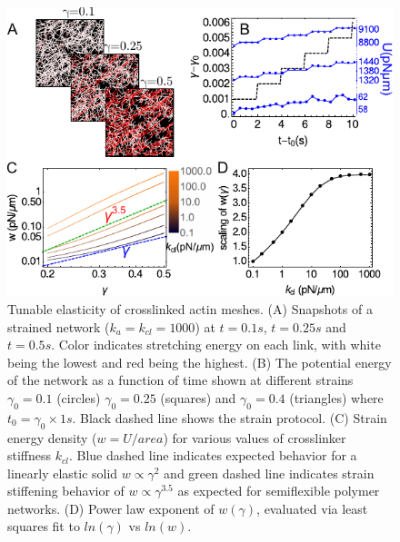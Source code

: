 \documentclass[12pt]{article}
\begin{document}
\begin{figure}[H]
  \centering
  \includegraphics[scale=1.2]{figs/shear_result.pdf}
  \caption{%
    \label{fig:stress}%
    Tunable elasticity of crosslinked actin meshes. 
    (A) Snapshots of a strained network ($k_a=k_{cl}=1000$) at $t=0.1s$, 
    $t=0.25s$ and $t=0.5s$. Color indicates stretching energy on each link, with
    white being the lowest and red being the highest. 
    (B) The potential energy of the network as a function of time shown at
    different strains $\gamma_0=0.1$ (circles) $\gamma_0=0.25$ (squares) and
    $\gamma_0=0.4$ (triangles) where $t_0=\gamma_0\times 1s$. Black dashed line
    shows the strain protocol.   
    (C) Strain energy density ($w=U/area$) for various values of crosslinker
    stiffness $k_{cl}$. Blue dashed line indicates expected behavior for a 
    linearly elastic solid $w\propto \gamma^2$ and green dashed line indicates
    strain stiffening behavior of $w\propto \gamma^{3.5}$ as expected 
    for semiflexible polymer networks\cite{gardel2004,lin2010}.
   (D) Power law exponent of $w(\gamma)$, evaluated via least squares fit to
   $ln(\gamma)$ vs $ln(w)$. 
  }
\end{figure}
\end{document}

